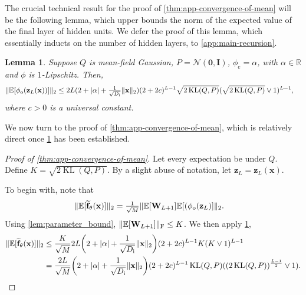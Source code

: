 \documentclass[twoside]{article}
\renewcommand{\ss}[1]{_{\text{#1}}}
\newcommand{\vnull}{\mathbf{0}}
\newcommand{\vf}{\mathbf{f}}
\newcommand{\vx}{\mathbf{x}}
\newcommand{\vz}{\mathbf{z}}
\newcommand{\vone}{\mathbf{1}}
\newcommand{\mI}{\mathbf{I}}
\newcommand{\mW}{\mathbf{W}}
\newcommand{\E}{\mathbb{E}}
\renewcommand{\P}{\mathbb{P}}
\newcommand{\Q}{\mathbb{Q}}
\renewcommand{\Q}{\ensuremath{Q}}
\renewcommand{\P}{\ensuremath{P}}
\newcommand{\R}{\mathbb{R}}
\newcommand{\KL}{\operatorname{KL}}
\newcommand{\Normal}{\mathcal{N}}
\renewcommand{\ss}[1]{_{\text{#1}}}        %
\DeclarePairedDelimiter\parens{(}{)}             %
\DeclarePairedDelimiter\norm{\|}{\|}             %
\DeclarePairedDelimiter\abs{|}{|}                %
\theoremstyle{theoremstyle}
\newtheorem{lemma}[theorem]{Lemma}
\begin{document}
The crucial technical result for the proof of \cref{thm:app-convergence-of-mean} will be the following lemma, which upper bounds the norm of the expected value of the final layer of hidden units. We defer the proof of this lemma, which essentially inducts on the number of hidden layers, to \cref{app:main-recursion}.
\begin{lemma}\label{lem:last-layer-bound}
 Suppose $\Q$ is mean-field Gaussian, $\P=\Normal(\vnull, \mI)$, $\phi_{e}=\alpha$, with $\alpha \in \R$ and $\phi$ is $1$-Lipschitz. Then,
\begin{align}
    \norm{\E[\phi\ss{o}(\vz_L(\vx))]}_2
    &\le 2L(2 + \abs{\alpha} + \tfrac{1}{\sqrt{D\ss{i}}}\norm{\vx}_2)(2 + 2c)^{L - 1}\sqrt{2\KL(Q,P)}(\sqrt{2\KL(Q,P)} \lor 1)^{L - 1},
\end{align}
where $c>0$ is a universal constant.
\end{lemma}

We now turn to the proof of \cref{thm:app-convergence-of-mean}, which is relatively direct once \cref{lem:last-layer-bound} has been established.
\begin{proof}[Proof of \cref{thm:app-convergence-of-mean}]
Let every expectation be under $\Q$. Define $K=\sqrt{2\KL(Q,P)}$. By a slight abuse of notation, let $\vz_L = \vz_L(\vx)$.

To begin with, note that
\begin{align}
    \norm{\E[\widetilde{\vf}_{\theta}(\vx)]}_2 
    &= \tfrac1{\sqrt{M}} \norm{\E[\mW_{L+1}]\E[(\phi\ss{o}(\vz_L)]}_2.
\end{align}
Using \cref{lem:parameter_bound}, $\norm{\E[\mW_{L+1}]}\ss{F} \le K$. We then apply \cref{lem:last-layer-bound},
\begin{align}
    \norm{\E[\widetilde{\vf}_{\theta}(\vx)]}_2 
    &\le \frac{K}{\sqrt{M}} %
        2L\parens*{2 + \abs{\alpha}+\frac{1}{\sqrt{D\ss{i}}}\|\vx\|_2}(2 + 2c)^{L - 1} K(K \lor 1)^{L - 1} \\
    &= \frac{2L}{\sqrt{M}} \parens*{2 + \abs{\alpha}+\frac{1}{\sqrt{D\ss{i}}}\|\vx\|_2} (2 + 2c)^{L-1}\KL(\Q, \P)\parens{(2\KL(\Q, \P))^\frac{L-1}{2} \lor 1}.%
\end{align}
\end{proof}
\end{document}
